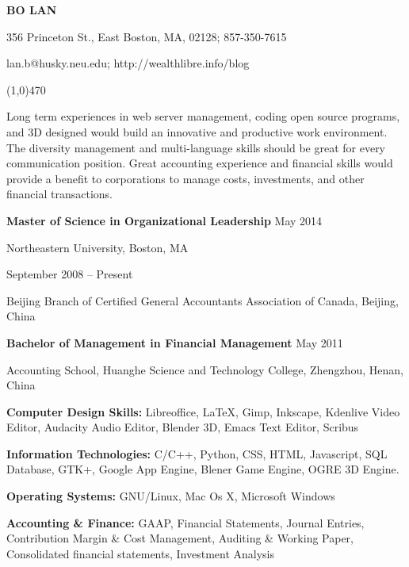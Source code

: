 \documentclass[10pt]{article}
\begin{document}
\centerline{\large \bf BO LAN}

\centerline{356 Princeton St., East Boston, MA, 02128; 857-350-7615}

\centerline{lan.b@husky.neu.edu; http://wealthlibre.info/blog}

\noindent

\centerline{\line(1,0){470}}

\medskip


\noindent
Long term experiences in web server management, coding open source programs, and 3D designed would build an innovative and productive work environment. The diversity management and multi-language skills should be great for every communication position. Great accounting experience and financial skills would provide a benefit to corporations to manage costs, investments, and other financial transactions.

\medskip


\noindent
{\bf Master of Science in Organizational Leadership} \hfill May 2014

\noindent
Northeastern University, Boston, MA

\smallskip

 \hfill  September 2008 -- Present

\noindent Beijing Branch of Certified General Accountants Association of Canada, Beijing, China

\smallskip

\noindent
{\bf Bachelor of Management in Financial Management} \hfill May 2011

\noindent
Accounting School, Huanghe Science and Technology College, Zhengzhou, Henan, China

\medskip


\noindent
{\bf Computer Design Skills:} Libreoffice, {\LaTeX}, Gimp, Inkscape, Kdenlive Video Editor, Audacity Audio Editor, Blender 3D, Emacs Text Editor, Scribus

\noindent
{\bf Information Technologies:} C/C++, Python, CSS, HTML, Javascript, SQL Database, GTK+, Google App Engine, Blener Game Engine, OGRE 3D Engine.

\noindent
{\bf Operating Systems:} GNU/Linux, Mac Os X, Microsoft Windows

\noindent
{\bf Accounting \& Finance:} GAAP, Financial Statements, Journal Entries, Contribution Margin \& Cost Management, Auditing \& Working Paper, Consolidated financial statements, Investment Analysis
\end{document}
